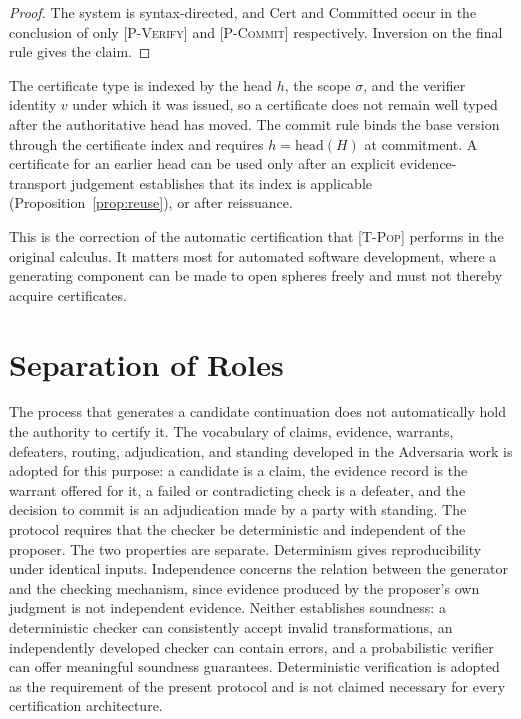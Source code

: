 \documentclass[12pt,oneside,openany]{book}
\theoremstyle{spherepop}
\theoremstyle{remarkstyle}
\begin{document}
\begin{proof}
The system is syntax-directed, and $\mathrm{Cert}$ and $\mathrm{Committed}$ occur in the conclusion of only \textsc{[P-Verify]} and \textsc{[P-Commit]} respectively. Inversion on the final rule gives the claim.
\end{proof}

The certificate type is indexed by the head $h$, the scope $\sigma$, and the verifier identity $v$ under which it was issued, so a certificate does not remain well typed after the authoritative head has moved. The commit rule binds the base version through the certificate index and requires $h=\mathrm{head}(H)$ at commitment. A certificate for an earlier head can be used only after an explicit evidence-transport judgement establishes that its index is applicable (Proposition~\ref{prop:reuse}), or after reissuance.

This is the correction of the automatic certification that \textsc{[T-Pop]} performs in the original calculus. It matters most for automated software development, where a generating component can be made to open spheres freely and must not thereby acquire certificates.

\section{Separation of Roles}

The process that generates a candidate continuation does not automatically hold the authority to certify it. The vocabulary of claims, evidence, warrants, defeaters, routing, adjudication, and standing developed in the Adversaria work is adopted for this purpose: a candidate is a claim, the evidence record is the warrant offered for it, a failed or contradicting check is a defeater, and the decision to commit is an adjudication made by a party with standing. The protocol requires that the checker be deterministic and independent of the proposer. The two properties are separate. Determinism gives reproducibility under identical inputs. Independence concerns the relation between the generator and the checking mechanism, since evidence produced by the proposer's own judgment is not independent evidence. Neither establishes soundness: a deterministic checker can consistently accept invalid transformations, an independently developed checker can contain errors, and a probabilistic verifier can offer meaningful soundness guarantees. Deterministic verification is adopted as the requirement of the present protocol and is not claimed necessary for every certification architecture.
\end{document}
